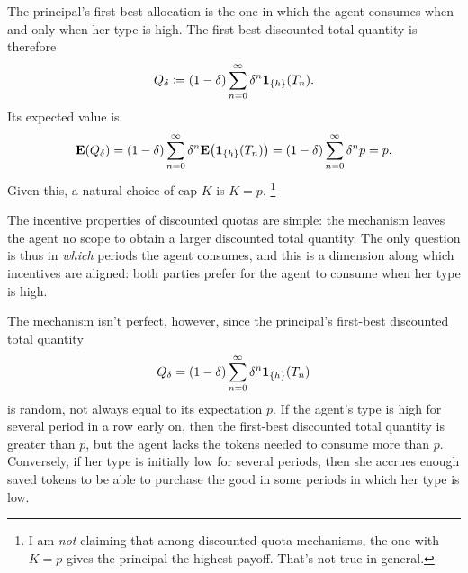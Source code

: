 The principal's first-best allocation
is the one in which the agent consumes when and only when her type is high.
The first-best discounted total quantity is therefore
%
\begin{equation*}
	Q_\delta \coloneqq (1-\delta)
	\sum_{n=0}^\infty \delta^n \boldsymbol{1}_{\{h\}}(T_n) .
\end{equation*}
%
Its expected value is
%
\begin{equation*}
	\E( Q_\delta )
	= (1-\delta) \sum_{n=0}^\infty \delta^n \E\left( \1_{\{h\}}(T_n) \right)
	= (1-\delta) \sum_{n=0}^\infty \delta^n p
	= p .
\end{equation*}
%
Given this, a natural choice of cap $K$ is $K = p$.%
	\footnote{I am \emph{not} claiming that among discounted-quota mechanisms, the one with $K=p$ gives the principal the highest payoff. That's not true in general.}

The incentive properties of discounted quotas are simple:
the mechanism leaves the agent no scope to obtain a larger discounted total quantity.
The only question is thus in \emph{which} periods the agent consumes,
and this is a dimension along which incentives are aligned:
both parties prefer for the agent to consume when her type is high.

The mechanism isn't perfect, however, since the principal's first-best discounted total quantity
%
\begin{equation*}
	Q_\delta = (1-\delta) \sum_{n=0}^\infty \delta^n \boldsymbol{1}_{\{h\}}(T_n)
\end{equation*}
%
is random, not always equal to its expectation $p$.
If the agent's type is high for several period in a row early on, then the first-best discounted total quantity is greater than $p$,
but the agent lacks the tokens needed to consume more than $p$.
Conversely, if her type is initially low for several periods, then she accrues enough saved tokens to be able to purchase the good in some periods in which her type is low.

